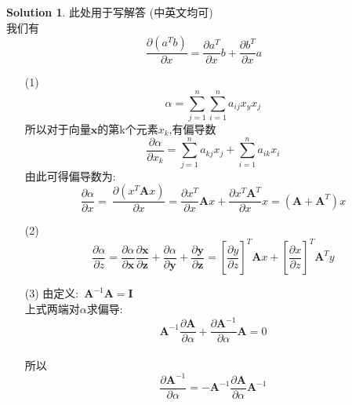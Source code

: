 \documentclass[a4paper,UTF8]{article}
\numberwithin{equation}{section}
\theoremstyle{definition}
\newtheorem*{solution}{Solution}
\def \A {\mathbf{A}}
\def \y {\mathbf{y}}
\def \x {\mathbf{x}}
\def \z {\mathbf{z}}
\def \I {\mathbf{I}}
\begin{document}
\begin{solution}
	此处用于写解答 (中英文均可)\\
	我们有
	\[	
		\frac{\partial(a^T b)}{\partial x}=\frac{\partial a^T}{\partial x}b+\frac{\partial b^T}{\partial x}a
	\]
	\begin{enumerate}
	\item[(1)]
	\[	
		\alpha = \sum_{j=1}^n \sum_{i=1}^n a_{ij}x_y x_j
	\]
	所以对于向量$\x$的第k个元素$x_k$,有偏导数
	\[
		\frac{\partial \alpha}{\partial x_k}=\sum_{j=1}^n a_{kj} x_j + \sum_{i=1}^n a_{ik}x_i
	\]
	由此可得偏导数为:
	\[
		\frac{\partial \alpha}{\partial x}=\ \frac{\partial {(x^T\A x)}}{\partial x}=\frac{\partial x^T}{\partial x}\A x+\frac{\partial x^T \A^T}{\partial x}x =(\A + \A^T)x
	\]
	\item[(2)]
	\[
		\frac{\partial \alpha}{\partial z}=\frac{\partial \alpha}{\partial \x}\frac{\partial \x}{\partial \z}+\frac{\partial \alpha}{\partial \y}+\frac{\partial \y}{\partial \z}=[\frac{\partial y}{\partial z}]^T \A x+[\frac{\partial x}{\partial z}]^T \A^T y
	\]
	\item[(3)]由定义:\ $\A^{-1}\A=\I$\\上式两端对$\alpha$求偏导:
	\[\A^{-1}\frac{\partial \A}{\partial \alpha}+\frac{\partial\A^{-1}}{\partial \alpha}\A=0\]
	 \\所以\[\frac{\partial \A^{-1}}{\partial \alpha}=-\A^{-1}\frac{\partial \A}{\partial \alpha} \A^{-1}\]
	\end{enumerate}
\end{solution}




\newpage
\end{document}
